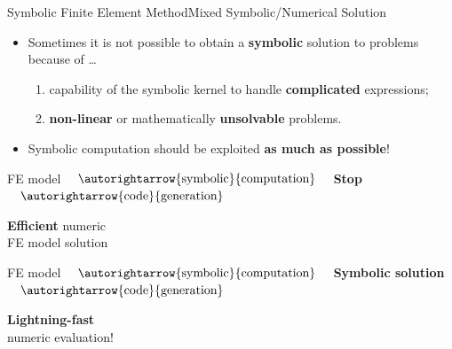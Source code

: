 \begin{frame}{Symbolic Finite Element Method}{Mixed Symbolic/Numerical Solution}
  \begin{itemize}
    \item Sometimes it is not possible to obtain a \textbf{symbolic} solution to problems because of \dots
    \begin{enumerate}
      \item capability of the symbolic kernel to handle \textbf{complicated} expressions;
      \item \textbf{non-linear} or mathematically \textbf{unsolvable} problems.
    \end{enumerate}
    \item Symbolic computation should be exploited \textbf{as much as possible}!
  \end{itemize}
  \begin{bbox}
    \centering
    \ac{FE} model $\quad \autorightarrow{\text{symbolic}}{\text{computation}} \quad$ \hspace*{1.05cm}\textcolor{mycolor2}{\textbf{Stop}}\hspace*{1.05cm} $\quad \autorightarrow{\text{code}}{\text{generation}} \quad$ \begin{minipage}[c]{0.27\linewidth}\begin{center}{\textcolor{fg_sl_color}{\textbf{Efficient}} numeric \\ \ac{FE} model solution}\end{center}\end{minipage}
  \end{bbox}
  \begin{bbox}
    \centering
    \ac{FE} model $\quad \autorightarrow{\text{symbolic}}{\text{computation}} \quad$ \textcolor{mycolor5}{\textbf{Symbolic solution}} $\quad \autorightarrow {\text{code}}{\text{generation}} \quad$ \begin{minipage}[c]{0.27\linewidth}\begin{center}{\textcolor{fg_sl_color}{\textbf{Lightning-fast}} \\ numeric evaluation!}\end{center}\end{minipage}
  \end{bbox}
\end{frame}


